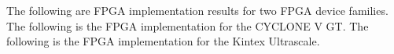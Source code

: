 \ifnum{}
\ifnum{}
The following are FPGA implementation results for two FPGA device families.
\fi
\ifnum{}
The following is the FPGA implementation for the CYCLONE V GT.
\fi
\fi
\ifnum{}
\ifnum{}
The following is the FPGA implementation for the Kintex Ultrascale. 
\fi
\fi



